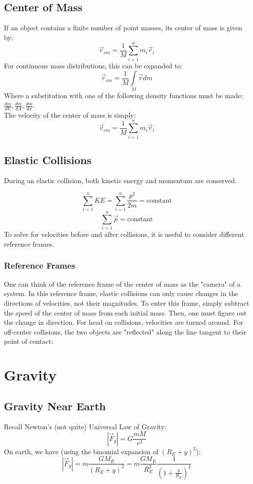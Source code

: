 \documentclass{article}
\begin{document}
\subsection{Center of Mass}If an object contains a finite number of point masses, its center of mass is given by:
$$\vec{r}_{cm}=\frac{1}{M}\sum \limits_{i=1}^{n}m_i \vec{r}_i$$
For continuous mass distributions, this can be expanded to:
$$\vec{r}_{cm}=\frac{1}{M} \int \limits_M \vec{r} dm$$
Where a substitution with one of the following density functions must be made: $\frac{dm}{dV}, \frac{dm}{dA}, \frac{dm}{dx}.$
\\
The velocity of the center of mass is simply:
$$\vec{v}_{cm}=\frac{1}{M}\sum \limits_{i=1}^{n}m_i \vec{v}_i$$

\subsection{Elastic Collisions}
During an elastic collision, both kinetic energy and momentum are conserved.

$$\sum \limits^{n}_{i=1}KE=\sum \limits^{n}_{i=1}\frac{p^2}{2m}=\text{constant}$$
$$\sum \limits^{n}_{i=1}\vec{p}=\text{constant}$$
To solve for velocities before and after collisions, it is useful to consider different reference frames.
\subsubsection{Reference Frames}
One can think of the reference frame of the center of mass as the "camera" of a system. In this reference frame, elastic collisions can only cause changes in the directions of velocities, not their magnitudes. To enter this frame, simply subtract the speed of the center of mass from each initial mass. Then, one must figure out the change in direction. For head on collisions, velocities are turned around. For off-center collisions, the two objects are "reflected" along the line tangent to their point of contact:




\pagebreak
\section{Gravity}
\subsection{Gravity Near Earth}
Recall Newton's (not quite) Universal Law of Gravity:
$$|\vec{F}_{g}|=G\frac{mM}{r^2}$$
On earth, we have (using the binomial expansion of $(R_E+y)^2$):
$$|\vec{F}_{g}|=m\frac{GM_E}{(R_{E}+y)^2}=m\frac{GM_E}{R^2_E}\frac{1}{(1+\frac{y}{R_E})^2}$$
\end{document}
